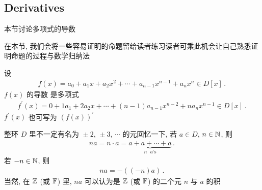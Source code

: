 \subsection*{Derivatives}

本节讨论多项式的导数\period

在本节, 我们会将一些容易证明的命题留给读者练习\period 读者可乘此机会让自己熟悉证明命题的过程与数学归纳法\period

\begin{definition}
    设
    \begin{align*}
        f(x) = a_0 + a_1 x + a_2 x^2 + \cdots + a_{n-1} x^{n-1} + a_n x^n \in D[x] \period
    \end{align*}
    $f(x)$ 的导数  是多项式
    \begin{align*}
        f^{\prime}(x) = 0 + 1a_1 + 2a_2 x + \cdots + (n-1)a_{n-1} x^{n-2} + na_n x^{n-1} \in D[x] \period
    \end{align*}
    $f^{\prime} (x)$ 也可写为 $(f(x))^{\prime}$\period
\end{definition}

\begin{remark}
    整环 $D$ 里不一定有名为 ${} \pm 2$, ${}\pm 3$, $\cdots$ 的元\period 回忆一下, 若 $a \in D$, $n \in \mathbb{N}$, 则
    \begin{align*}
        na = n \cdot a = \underbrace{a + a + \cdots + a}_{\text{$n$ $a$'s}} \period
    \end{align*}
    若 $-n \in \mathbb{N}$, 则
    \begin{align*}
        na = -((-n)a) \period
    \end{align*}
    当然, 在 $\mathbb{Z}$ (或 $\mathbb{F}$) 里, $na$ 可以认为是 $\mathbb{Z}$ (或 $\mathbb{F}$) 的二个元 $n$ 与 $a$ 的积\period
\end{remark}

